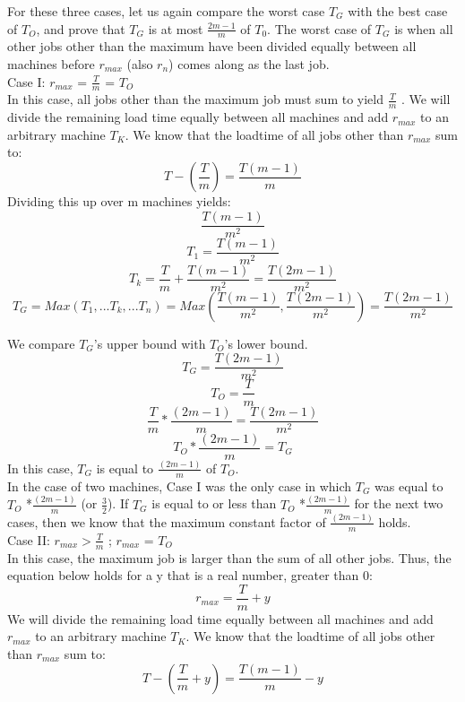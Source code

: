\documentclass[11pt, solution, letterpaper]{format}
\begin{document}
For these three cases, let us again compare the worst case $T_G$ with the best case of $T_O$, and prove that $T_G$ is at most $\frac{2m-1}{m}$ of $T_0$. The worst case of $T_G$ is when all other jobs other than the maximum have been divided equally between all machines before $r_{max}$ (also $r_n$) comes along as the last job.\\

Case I: $r_{max}$ = $\frac{T}{m}$ = $T_O$ \\
In this case, all jobs other than the maximum job must sum to yield $\frac{T}{m}$ . We will divide the remaining load time equally between all machines and add $r_{max}$ to an arbitrary machine $T_K$. We know that the loadtime of all jobs other than $r_{max}$ sum to:\\
$$T - (\frac{T}{m}) = \frac{T(m-1)}{m}$$
Dividing this up over m machines yields:\\ $$\frac{T(m-1)}{m^2}$$
$$T_1 = \frac{T(m-1)}{m^2}$$
$$T_k = \frac{T}{m} + \frac{T(m-1)}{m^2} = \frac{T(2m - 1)}{m^2}$$
$$T_G = Max(T_1, ...T_k,... T_n) = Max(\frac{T(m-1)}{m^2}, \frac{T(2m - 1)}{m^2}) = \frac{T(2m - 1)}{m^2}$$

We compare $T_G$'s upper bound with $T_O$'s lower bound.\\
$$T_G = \frac{T(2m - 1)}{m^2}$$
$$T_O = \frac{T}{m}$$
$$ \frac{T}{m} * \frac{(2m - 1)}{m} = \frac{T(2m - 1)}{m^2}$$
$$T_O * \frac{(2m - 1)}{m} = T_G$$
In this case, $T_G$ is equal to $\frac{(2m - 1)}{m}$ of $T_O$.\\


In the case of two machines, Case I was the only case in which $T_G$ was equal to $T_O$ *$\frac{(2m - 1)}{m}$ (or $\frac{3}{2}$). If $T_G$ is equal to or less than $T_O$ *$\frac{(2m - 1)}{m}$ for the next two cases, then we know that the maximum constant factor of $\frac{(2m - 1)}{m}$ holds. \\




Case II: $r_{max} > \frac{T}{m}$ ; $r_{max}$ = $T_O$\\
In this case, the maximum job is larger than the sum of all other jobs. Thus, the equation below holds for a y that is a real number, greater than 0: \\
$$r_{max} = \frac{T}{m} + y$$
We will divide the remaining load time equally between all machines and add $r_{max}$ to an arbitrary machine $T_K$. We know that the loadtime of all jobs other than $r_{max}$ sum to:
$$T - (\frac{T}{m} + y) = \frac{T(m-1)}{m} - y$$\\
\end{document}
